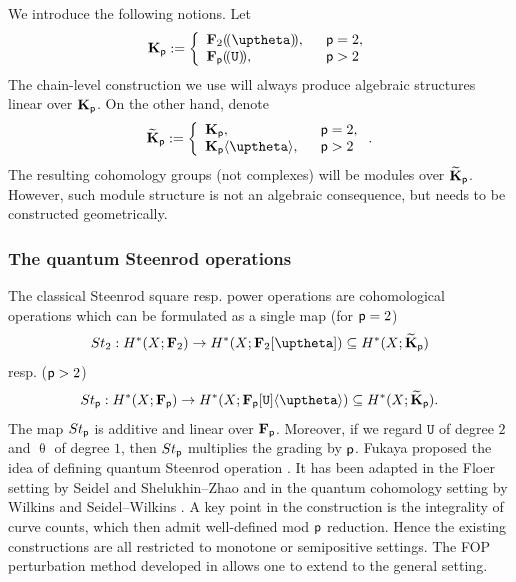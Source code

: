 \documentclass[reqno, 10pt]{amsart}
\numberwithin{equation}{section}
\numberwithin{equation}{section}
\renewcommand{\subset}{\subseteq}
\theoremstyle{definition}
\theoremstyle{remark}
\newcommand{\beqn}{\begin{equation*}}
\newcommand{\eeqn}{\end{equation*}}
\newcommand{\p}{{\sf p}}
\newcommand{\fp}{{\bf F}_{\sf p}}
\newcommand{\tkp}{\wt{\bf K}_{\sf p}}
\newcommand{\tu}{\mathtt{U}}
\newcommand{\lsu}{{(\!(\tu)\!)}}
\newcommand{\lst}{{(\!(\uptheta)\!)}}
\newcommand{\wt}{\widetilde}
\begin{document}
We introduce the following notions. Let 
\beqn
{\bf K}_\p:= \left\{ \begin{array}{ll} {\bf F}_2\lst,\ &\ \p = 2,\\
\fp \lsu,\ &\ \p > 2
\end{array}\right.
\eeqn
The chain-level construction we use will always produce algebraic structures linear over ${\bf K}_\p$. On the other hand, denote
\beqn
\tkp:= \left\{ \begin{array}{ll} {\bf K}_\p,\ &\ \p = 2,\\
{\bf K}_\p \langle \uptheta \rangle ,\ &\ \p> 2 \end{array} \right. .
\eeqn
The resulting cohomology groups (not complexes) will be modules over $\tkp$. However, such module structure is not an algebraic consequence, but needs to be constructed geometrically.

\subsubsection{The quantum Steenrod operations}

The classical Steenrod square resp. power operations are cohomological operations which can be formulated as a single map (for $\p = 2$)
\beqn
St_2: H^*(X; {\bf F}_2) \to H^*(X; {\bf F}_2[\uptheta])\subset  H^*(X; \tkp)
\eeqn
resp. ($\p > 2$)
\beqn
St_\p: H^*(X; \fp) \to H^*(X; \fp[\tu] \langle \uptheta \rangle ) \subset H^*(X; \tkp).
\eeqn
The map $St_\p$ is additive and linear over $\fp$. Moreover, if we regard $\tu$ of degree $2$ and $\uptheta$ of degree $1$, then $St_\p$ multiplies the grading by $\p$. Fukaya proposed the idea of defining quantum Steenrod operation \cite{Fukaya_Morse}. It has been adapted in the Floer setting by Seidel \cite{Seidel_pants} and Shelukhin--Zhao \cite{shelukhin-zhao} and in the quantum cohomology setting by Wilkins \cite{Wilkins_2020} and Seidel--Wilkins \cite{Seidel_Wilkins_2022}. A key point in the construction is the integrality of curve counts, which then admit well-defined mod $\p$ reduction. Hence the existing constructions are all restricted to monotone or semipositive settings. The FOP perturbation method developed in \cite{Bai_Xu_2022} allows one to extend to the general setting. 
\end{document}
